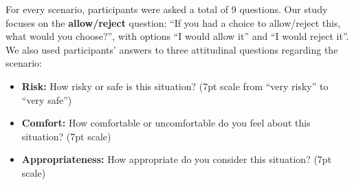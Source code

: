 For every scenario, participants were asked a total of 9 questions. Our study focuses on the \textbf{allow/reject} question: ``If you had a choice to allow/reject this, what would you choose?'', with options ``I would allow it'' and ``I would reject it''. We also used participants' answers to three attitudinal questions regarding the scenario:
\begin{itemize}
	\item \textbf{Risk:} How risky or safe is this situation? (7pt scale from ``very risky'' to ``very safe'')
	\item \textbf{Comfort:} How comfortable or uncomfortable do you feel about this situation? (7pt scale)
	\item \textbf{Appropriateness:} How appropriate do you consider this situation? (7pt scale)
\end{itemize}

